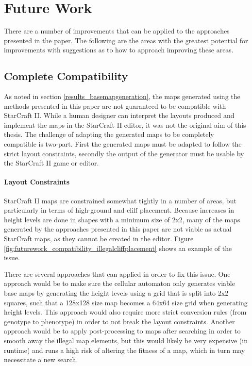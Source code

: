 \chapter{Future Work}
\label{futurework}
There are a number of improvements that can be applied to the approaches presented in the paper. The following are the areas with the greatest potential for improvements with suggestions as to how to approach improving these areas.
\section{Complete Compatibility}
\label{futurework_compatibility}
As noted in section \ref{results_basemapgeneration}, the maps generated using the methods presented in this paper are not guaranteed to be compatible with StarCraft II. While a human designer can interpret the layouts produced and implement the maps in the StarCraft II editor, it was not the original aim of this thesis. The challenge of adapting the generated maps to be completely compatible is two-part. First the generated maps must be adapted to follow the strict layout constraints, secondly the output of the generator must be usable by the StarCraft II game or editor. 

\subsubsection{Layout Constraints}
StarCraft II maps are constrained somewhat tightly in a number of areas, but particularly in terms of high-ground and cliff placement. Because increases in height levels are done in shapes with a minimum size of 2x2, many of the maps generated by the approaches presented in this paper are not viable as actual StarCraft maps, as they cannot be created in the editor. Figure \ref{fig:futurework_compatibility_illegalcliffplacement} shows an example of the issue.


There are several approaches that can applied in order to fix this issue. One approach would be to make sure the cellular automaton only generates viable base maps by generating the height levels using a grid that is split into 2x2 squares, such that a 128x128 size map becomes a 64x64 size grid when generating height levels. This approach would also require more strict conversion rules (from genotype to phenotype) in order to not break the layout constraints. Another approach would be to apply post-processing to maps after searching in order to smooth away the illegal map elements, but this would likely be very expensive (in runtime) and runs a high risk of altering the fitness of a map, which in turn may necessitate a new search. 

